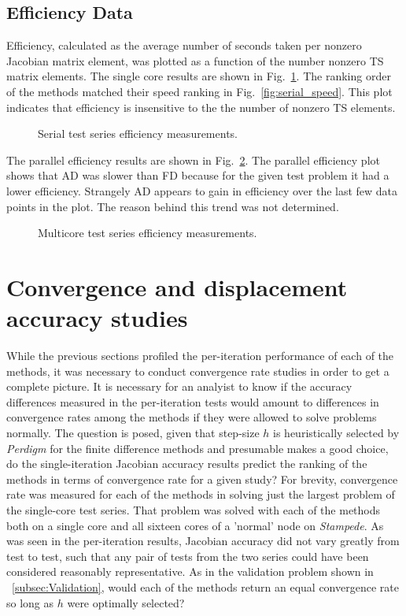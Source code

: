 \documentclass[preprint,12pt]{elsarticle}
\begin{document}
\subsection{Efficiency Data}
Efficiency, calculated as the average number of seconds taken per nonzero Jacobian matrix element, was plotted as a function of the number nonzero TS matrix elements. The single core results are shown in Fig.~\ref{fig:serial_efficiency}.  The ranking order of the methods
matched their speed ranking in Fig.~\ref{fig:serial_speed}. This plot indicates that efficiency is insensitive to the the number of nonzero TS elements.  
%
\begin{figure}[tbp]
  \centering
  \scalebox{1.0}{}
  \caption{Serial test series efficiency measurements.}
  \label{fig:serial_efficiency}
\end{figure}
%
The parallel efficiency results are shown in Fig.~\ref{fig:multi_efficiency}. The parallel efficiency plot shows that AD was slower than FD because for the given test problem it had a lower efficiency. Strangely AD appears to gain in efficiency over the last few data points in the plot. The reason behind this trend was not determined.
%
\begin{figure}[tbp]
  \centering
  \scalebox{1.0}{}
  \caption{Multicore test series efficiency measurements.}
  \label{fig:multi_efficiency}
\end{figure}

\section{Convergence and displacement accuracy studies} 
\label{sec:PeridigmConvergenceStudy}
%
While the previous sections profiled the per-iteration performance of each of
the methods, it was necessary to conduct convergence rate studies in order to
get a complete picture. It is necessary for an analyist to know if the
accuracy differences measured in the per-iteration tests would amount to
differences in convergence rates among the methods if they were allowed to solve problems
normally. The question is posed, given that step-size $h$ is heuristically
selected by \emph{Perdigm} for the finite difference methods and presumable
makes a good choice, do the single-iteration Jacobian accuracy results predict
the ranking of the methods in terms of convergence rate for a given study? For
brevity, convergence rate was measured for each of the methods in solving just
the largest problem of the single-core test series. That problem was solved with each of the methods
both on a single core and all sixteen cores of a 'normal' node on \emph{Stampede}. As was seen in the per-iteration results,
Jacobian accuracy did not vary greatly from test to test, such that any pair of tests
from the two series could have been considered reasonably representative. As in
the validation problem shown in ~\ref{subsec:Validation}, would each of the methods return an
equal convergence rate so long as $h$ were optimally selected? 
\end{document}
